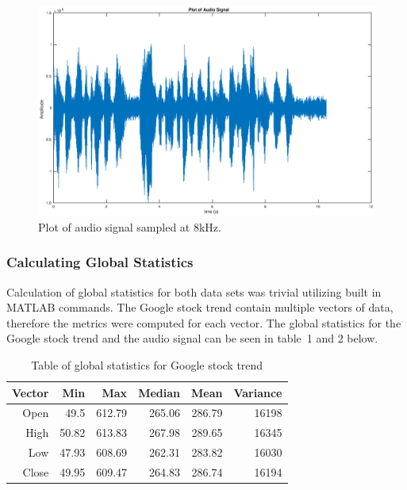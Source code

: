 \documentclass[11pt]{article}
\begin{document}
\begin{figure}[H] %
	\centering 
	\includegraphics[width=\linewidth]{plot_03}
	\caption{Plot of audio signal sampled at 8kHz.}
	\label{fig: plot_03} 
\end{figure}

\subsubsection{Calculating Global Statistics} 
Calculation of global statistics for both data sets was trivial utilizing built in MATLAB commands. The Google stock trend contain multiple vectors of data, therefore the metrics were computed for each vector. The global statistics for the Google stock trend and the audio signal can be seen in table~1 and 2 below. 


\begin{table}[H] %
  \centering
    \begin{tabular}{rrrrrr}
    \toprule
    \textbf{Vector} & \textbf{Min} & \textbf{Max} & \textbf{Median} & \textbf{Mean} & \textbf{Variance } \\
    \midrule
    Open  & 49.5  & 612.79 & 265.06 & 286.79 & 16198 \\
    High  & 50.82 & 613.83 & 267.98 & 289.65 & 16345 \\
    Low   & 47.93 & 608.69 & 262.31 & 283.82 & 16030 \\
    Close & 49.95 & 609.47 & 264.83 & 286.74 & 16194 \\
    \bottomrule
    \end{tabular}%
  \caption{Table of global statistics for Google stock trend}
  \label{tab: table_1}
\end{table}%
\end{document}
